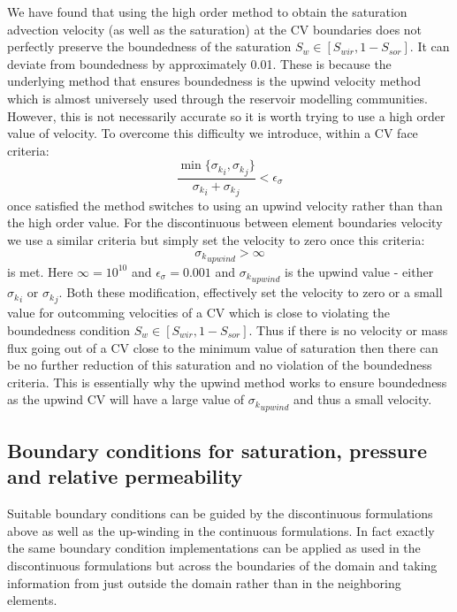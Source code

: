 We have found that using the high order method to obtain the saturation advection 
velocity (as well as the saturation) at the CV boundaries does not perfectly preserve 
the boundedness of the saturation $S_w\in \left[ S_{wir}, 1-S_{sor} \right]$. 
It can deviate from boundedness by approximately 0.01. 
These is because the underlying method that ensures boundedness is the upwind 
velocity method which is almost universely used through the reservoir 
modelling communities. However, this is not necessarily accurate so it 
is worth trying to use a high order value of velocity. 
To overcome this difficulty we introduce,  within a CV face criteria:
\begin{equation}
\frac{ \min\{ {\sigma_k}_i, {\sigma_k}_j \}  }{{\sigma_k}_i +{\sigma_k}_j} < \epsilon_\sigma 
\end{equation} 
once satisfied the method switches to using an upwind velocity rather than 
than the high order value. 
For the discontinuous between element boundaries velocity we use a similar criteria 
but simply set the velocity to zero once this criteria:
\begin{equation}
{\sigma_k}_{upwind} > \infty
\end{equation} 
is met. Here $\infty=10^{10}$ and $\epsilon_\sigma=0.001$ and 
${\sigma_k}_{upwind}$ is the upwind value - either ${\sigma_k}_i$ or ${\sigma_k}_j$. 
Both these modification, effectively set the velocity to zero or a small value 
for outcomming velocities of a CV which is close to violating the boundedness 
condition  $S_w\in \left[ S_{wir}, 1-S_{sor} \right]$. 
Thus if there is no velocity or mass flux going out of a CV close to 
the minimum value of saturation then there can be no further reduction of this saturation and no 
violation of the boundedness criteria. 
This is essentially why the upwind method works to ensure boundedness as the 
upwind CV will have a large value of ${\sigma_k}_{upwind}$ and thus a small 
velocity. 




\subsection{Boundary conditions for saturation, pressure and relative permeability} 
\label{bcs-rel-perm} 
Suitable boundary conditions can be guided by the 
discontinuous formulations above as well as the up-winding in 
the continuous formulations. In fact exactly the same 
boundary condition implementations can be applied as used in 
the discontinuous formulations but across the boundaries 
of the domain and taking information from just outside the domain 
rather than in the neighboring elements. 


